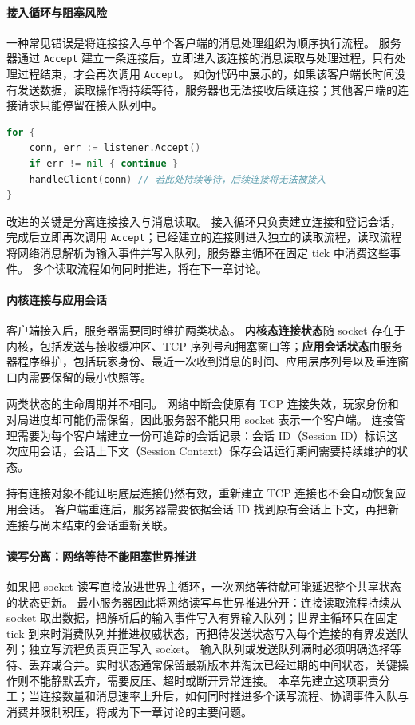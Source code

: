 \paragraph{接入循环与阻塞风险}
一种常见错误是将连接接入与单个客户端的消息处理组织为顺序执行流程。
服务器通过 \texttt{Accept} 建立一条连接后，立即进入该连接的消息读取与处理过程，只有处理过程结束，才会再次调用 \texttt{Accept}。
如伪代码中展示的，如果该客户端长时间没有发送数据，读取操作将持续等待，服务器也无法接收后续连接；其他客户端的连接请求只能停留在接入队列中。

\begin{tcolorbox}[title=阻塞式连接处理的反例]
\begin{lstlisting}[style=codeblock, language=go]
for {
    conn, err := listener.Accept()
    if err != nil { continue }
    handleClient(conn) // 若此处持续等待，后续连接将无法被接入
}
\end{lstlisting}
\end{tcolorbox}

改进的关键是分离连接接入与消息读取。
接入循环只负责建立连接和登记会话，完成后立即再次调用 \texttt{Accept}；已经建立的连接则进入独立的读取流程，读取流程将网络消息解析为输入事件并写入队列，服务器主循环在固定 tick 中消费这些事件。
多个读取流程如何同时推进，将在下一章讨论。

\paragraph{内核连接与应用会话}
客户端接入后，服务器需要同时维护两类状态。
\textbf{内核态连接状态}随 socket 存在于内核，包括发送与接收缓冲区、TCP 序列号和拥塞窗口等；\textbf{应用会话状态}由服务器程序维护，包括玩家身份、最近一次收到消息的时间、应用层序列号以及重连窗口内需要保留的最小快照等。

两类状态的生命周期并不相同。
网络中断会使原有 TCP 连接失效，玩家身份和对局进度却可能仍需保留，因此服务器不能只用 socket 表示一个客户端。
连接管理需要为每个客户端建立一份可追踪的会话记录：会话 ID（Session ID）标识这次应用会话，会话上下文（Session Context）保存会话运行期间需要持续维护的状态。

持有连接对象不能证明底层连接仍然有效，重新建立 TCP 连接也不会自动恢复应用会话。
客户端重连后，服务器需要依据会话 ID 找到原有会话上下文，再把新连接与尚未结束的会话重新关联。

\paragraph{读写分离：网络等待不能阻塞世界推进}
如果把 socket 读写直接放进世界主循环，一次网络等待就可能延迟整个共享状态的状态更新。
最小服务器因此将网络读写与世界推进分开：连接读取流程持续从 socket 取出数据，把解析后的输入事件写入有界输入队列；世界主循环只在固定 tick 到来时消费队列并推进权威状态，再把待发送状态写入每个连接的有界发送队列；独立写流程负责真正写入 socket。
输入队列或发送队列满时必须明确选择等待、丢弃或合并。实时状态通常保留最新版本并淘汰已经过期的中间状态，关键操作则不能静默丢弃，需要反压、超时或断开异常连接。
本章先建立这项职责分工；当连接数量和消息速率上升后，如何同时推进多个读写流程、协调事件入队与消费并限制积压，将成为下一章讨论的主要问题。

